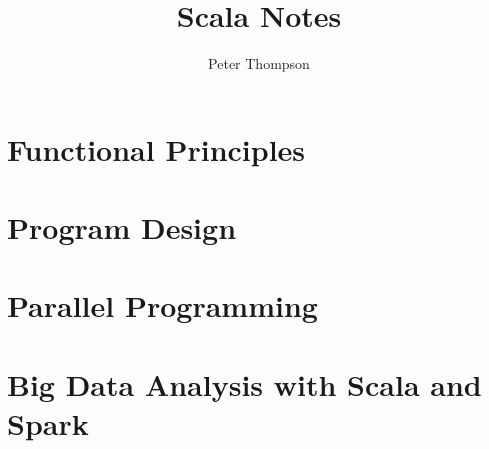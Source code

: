 \documentclass{report}
\title{Scala Notes}
\author{Peter Thompson}
\begin{document}
\maketitle
\tableofcontents
\part{Functional Principles}

\part{Program Design}

\part{Parallel Programming}

\part{Big Data Analysis with Scala and Spark}




\end{document}
